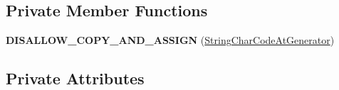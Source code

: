 \subsection*{Private Member Functions}
\begin{DoxyCompactItemize}
\item 
{\bfseries D\+I\+S\+A\+L\+L\+O\+W\+\_\+\+C\+O\+P\+Y\+\_\+\+A\+N\+D\+\_\+\+A\+S\+S\+I\+GN} (\hyperlink{classv8_1_1internal_1_1_string_char_code_at_generator}{String\+Char\+Code\+At\+Generator})\hypertarget{classv8_1_1internal_1_1_string_char_code_at_generator_ab53dada7dc0c2374edeedf145f11a111}{}\label{classv8_1_1internal_1_1_string_char_code_at_generator_ab53dada7dc0c2374edeedf145f11a111}

\end{DoxyCompactItemize}
\subsection*{Private Attributes}
